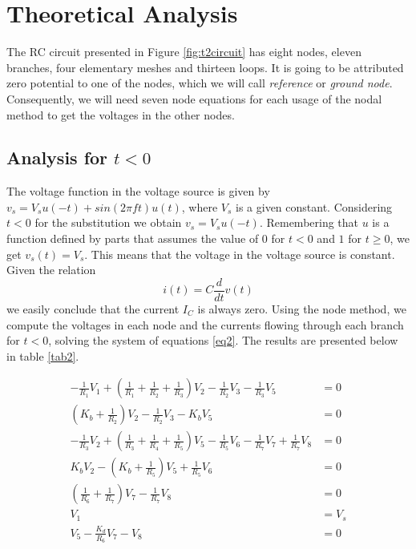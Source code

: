 \section{Theoretical Analysis}
\label{sec:analysis}
The RC circuit presented in Figure \ref{fig:t2circuit} has eight nodes, eleven branches, four elementary meshes and thirteen loops. It is going to be attributed zero potential to one of the nodes, which we will call  \textit{reference} or \textit{ground node}.
Consequently, we will need seven node equations for each usage of the nodal method to get the voltages in the other nodes.

\subsection{Analysis for $t<0$}\label{sec2.1}

The voltage function in the voltage source is given by $v_s=V_s u(-t)+sin(2\pi ft)u(t)$, where $V_s$ is a given constant. Considering $t<0$ for the substitution we obtain $v_s=V_s u(-t)$. Remembering that $u$ is a function defined by parts that assumes the value of $0$ for $t<0$ and $1$ for $t\geq 0$, we get $v_s(t)=V_s$. This means that the voltage in the voltage source is constant. 
Given the relation 
\begin{equation} \label{eq1}
    i(t)=C \frac{d}{dt}v(t)
\end{equation}
we easily conclude that the current $I_C$ is always zero. 
Using the node method, we compute the voltages in each node and the currents flowing through each branch for $t<0$, solving the system of equations \ref{eq2}. The results are presented below in table \ref{tab2}.

\begin{equation} \label{eq2}
\begin{split}
-\frac{1}{R_1}V_1+\left(\frac{1}{R_1}+\frac{1}{R_2}+\frac{1}{R_3}\right)V_2-\frac{1}{R_2}V_3-\frac{1}{R_3}V_5&=0 \\
\left(K_b+\frac{1}{R_2}\right)V_2-\frac{1}{R_2}V_3-K_b V_5&=0 \\
-\frac{1}{R_3}V_2+\left(\frac{1}{R_3}+\frac{1}{R_4}+\frac{1}{R_5}\right)V_5-\frac{1}{R_5}V_6-\frac{1}{R_7}V_7+\frac{1}{R_7}V_8&=0 \\
K_b V_2-\left(K_b+\frac{1}{R_5}\right)V_5+\frac{1}{R_5}V_6&=0 \\
\left(\frac{1}{R_6}+\frac{1}{R_7}\right)V_7-\frac{1}{R_7}V_8&=0 \\
V_1&=V_s \\ 
V_5-\frac{K_d}{R_6}V_7-V_8&=0 \\   
\end{split}
\end{equation}


